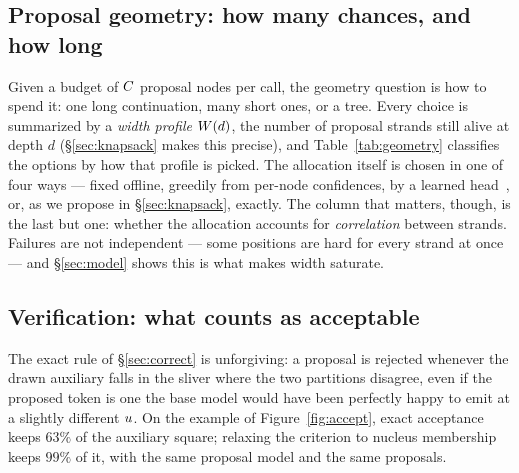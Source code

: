 \documentclass{article} %
\makeatletter
\newenvironment{ai}
  {\color{lightgray}%
   \@ifpackageloaded{caption}{\captionsetup{font={color=lightgray}}}{}%
   \let\ai@savedfloatreset\@floatboxreset
   \g@addto@macro\@floatboxreset{\color{lightgray}}}
  {\global\let\@floatboxreset\ai@savedfloatreset}
\makeatother
\begin{document}
\begin{ai}
\begin{table}[t]
  \centering
  \caption{Proposal sources. ``cost per token'' is the marginal cost of one more
  proposed token; ``conf.'' is whether a calibrated per-token confidence is
  available ($q$ a full distribution, $c_j$ / $c_k$ a scalar, ``per pos.'' a
  score that ignores the other proposed positions, ``stale'' one carried over
  from an earlier step); ``coord.'' is whether tokens are predicted jointly
  rather than independently.}
  \label{tab:source}
  
\end{table}

\subsection{Proposal geometry: how many chances, and how long}
\label{sec:geometry}

Given a budget of $C$ proposal nodes per call, the geometry question is how
to spend it: one long continuation, many short ones, or a tree. Every choice is
summarized by a \emph{width profile} $W(d)$, the number of proposal strands
still alive at depth $d$ (\S\ref{sec:knapsack} makes this precise), and
Table~\ref{tab:geometry} classifies the options by how that profile is picked.
The allocation itself is chosen in one of four ways --- fixed offline, greedily
from per-node confidences, by a learned head~\citep{shi2026specblock}, or, as we
propose in \S\ref{sec:knapsack}, exactly. The column that matters, though, is the
last but one: whether the allocation accounts for \emph{correlation} between
strands. Failures are not independent --- some
positions are hard for every strand at once --- and \S\ref{sec:model} shows this
is what makes width saturate.

\begin{table}[t]
  \centering
  \caption{Proposal geometries. ``correlated'' is whether the allocation rule
  models dependence between sibling strands rather than treating per-node
  acceptance as independent. $\Sfun[w,d]$ is the survival function of
  \S\ref{sec:model}.}
  \label{tab:geometry}
  
\end{table}

\subsection{Verification: what counts as acceptable}
\label{sec:verification}

The exact rule of \S\ref{sec:correct} is unforgiving: a proposal is rejected
whenever the drawn auxiliary falls in the sliver where the two partitions
disagree, even if the proposed token is one the base model would have been
perfectly happy to emit at a slightly different $u$. On the example of
Figure~\ref{fig:accept}, exact acceptance keeps $63\%$ of the auxiliary square;
relaxing the criterion to nucleus membership keeps $99\%$ of it, with the same
proposal model and the same proposals.


\end{ai}
\end{document}
